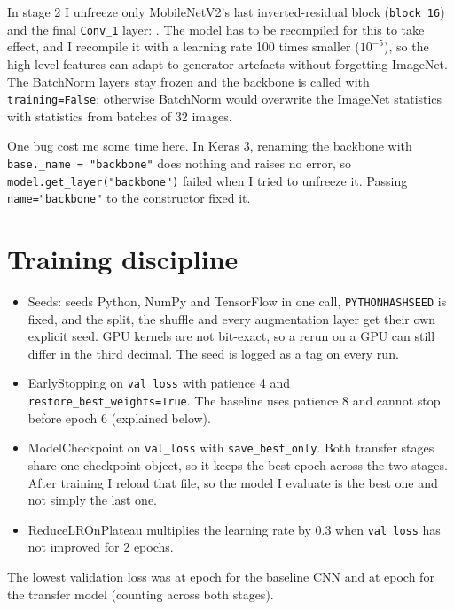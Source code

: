In stage 2 I unfreeze only MobileNetV2's last inverted-residual block (\texttt{block\_16}) and the
final \texttt{Conv\_1} layer:
.
The model has to be recompiled for this to take effect, and I recompile it with a learning rate
100 times smaller ($10^{-5}$), so the high-level features can adapt to generator artefacts without
forgetting ImageNet. The BatchNorm layers stay frozen and the backbone is called with
\texttt{training=False}; otherwise BatchNorm would overwrite the ImageNet statistics with
statistics from batches of 32 images.


One bug cost me some time here. In Keras 3, renaming the backbone with
\texttt{base.\_name = "backbone"} does nothing and raises no error, so
\texttt{model.get\_layer("backbone")} failed when I tried to unfreeze it. Passing
\texttt{name="backbone"} to the constructor fixed it.

\section{Training discipline}
\begin{itemize}
\item Seeds:  seeds Python, NumPy and TensorFlow in one call,
\texttt{PYTHONHASHSEED} is fixed, and the split, the shuffle and every augmentation layer get their
own explicit seed. GPU kernels are not bit-exact, so a rerun on a GPU can still differ in the third
decimal. The seed is logged as a tag on every run.
\item EarlyStopping on \texttt{val\_loss} with patience 4 and \texttt{restore\_best\_weights=True}.
The baseline uses patience 8 and cannot stop before epoch 6 (explained below).
\item ModelCheckpoint on \texttt{val\_loss} with \texttt{save\_best\_only}. Both transfer stages
share one checkpoint object, so it keeps the best epoch across the two stages. After training I
reload that file, so the model I evaluate is the best one and not simply the last one.
\item ReduceLROnPlateau multiplies the learning rate by 0.3 when \texttt{val\_loss} has not improved
for 2 epochs.
\end{itemize}
The lowest validation loss was at epoch \vgBaselineBestEpoch{} for the baseline CNN and at epoch
\vgTransferBestEpoch{} for the transfer model (counting across both stages).

